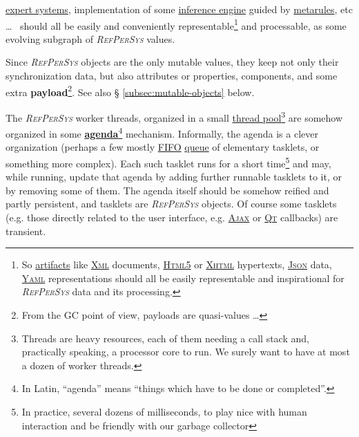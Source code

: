 \documentclass[11pt,a4paper,svgnames]{article}
\newcommand{\RefPerSys}{{\textit{\textsc{RefPerSys}}}}
\begin{document}
\href{https://en.wikipedia.org/wiki/Expert\_system}{expert systems},
implementation of some
\href{https://en.wikipedia.org/wiki/Inference_engine}{inference
  engine} guided by
\href{https://en.wiktionary.org/wiki/metarule}{metarules}, etc \ldots~
should all be easily and conveniently representable\footnote{So
\href{https://en.wikipedia.org/wiki/Artifact_(software_development)}{artifacts}
like \href{https://en.wikipedia.org/wiki/XML}{\textsc{Xml}} documents,
\href{https://en.wikipedia.org/wiki/HTML5}{\textsc{Html5}} or
\href{https://en.wikipedia.org/wiki/XHTML}{\textsc{Xhtml}} hypertexts,
\href{http://json.org/}{\textsc{Json}} data,
\href{https://yaml.org/}{\textsc{Yaml}} representations should all be
easily representable and inspirational for {\RefPerSys} data and its
processing.}  and processable, as some evolving subgraph of
{\RefPerSys} values.

Since {\RefPerSys} objects are the only mutable values, they keep not
only their synchronization data, but also attributes or properties,
components, and some extra 
\textbf{payload}\footnote{From the GC point of view, payloads are
quasi-values  \ldots}. See also \S
  \ref{subsec:mutable-objects} below.

The {\RefPerSys} worker threads, organized in a small
\href{https://en.wikipedia.org/wiki/Thread_pool}{thread
  pool}\footnote{Threads are heavy resources, each of them needing a
call stack and, practically speaking, a processor core to run. We
surely want to have at most a dozen of worker threads.} are somehow
organized in some
\href{https://en.wikipedia.org/wiki/Agenda}{\textbf{agenda}}\footnote{In
Latin, ``agenda'' means ``things which have to be done or
completed''.}  mechanism. Informally, the agenda is a clever
organization (perhaps a few mostly
\href{https://en.wikipedia.org/wiki/FIFO}{FIFO}
\href{https://en.wikipedia.org/wiki/Queue\_(abstract\_data\_type)}{queue}
of elementary tasklets, or something more complex). Each such tasklet
runs for a short time\footnote{In practice, several dozens of
milliseconds, to play nice with human interaction and be friendly with
our garbage collector} and may, while running, update that agenda by
adding further runnable tasklets to it, or by removing some of
them. The agenda itself should be somehow reified and partly
persistent, and tasklets are {\RefPerSys} objects. Of course some
tasklets (e.g. those directly related to the user interface,
e.g. \href{https://en.wikipedia.org/wiki/Ajax_(programming)}{\textsc{Ajax}}
or \href{http://qt.io/}{\textsc{Qt}} callbacks) are transient.
\end{document}
